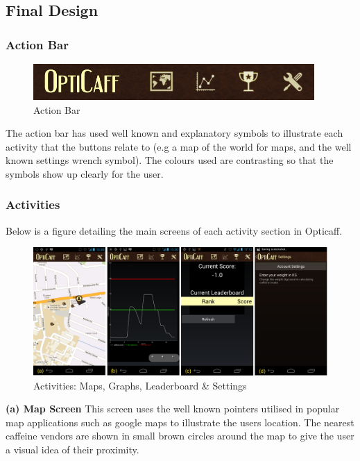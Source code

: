\subsection{Final Design}

\subsubsection{Action Bar}
\begin{figure}[ht]
\begin{center}
\includegraphics[scale=1]{images/actionbar.png}
\caption{Action Bar} 
\end{center}
\end{figure}

The action bar has used well known and explanatory symbols to illustrate each activity that the buttons relate to (e.g a map of the world for maps, and the well known settings wrench symbol). The colours used are contrasting so that the symbols show up clearly for the user. 

\newpage
\subsubsection{Activities}

Below is a figure detailing the main screens of each activity section in Opticaff. 

\begin{figure}[ht]
\begin{center}
\includegraphics[scale=0.23]{images/app.png}
\caption{Activities: Maps, Graphs, Leaderboard \& Settings} 
\end{center}
\end{figure}

\textbf{(a) Map Screen} \newline
This screen uses the well known pointers utilised in popular map applications such as google maps to illustrate the users location. The nearest caffeine vendors are shown in small brown circles around the map to give the user a visual idea of their proximity.

